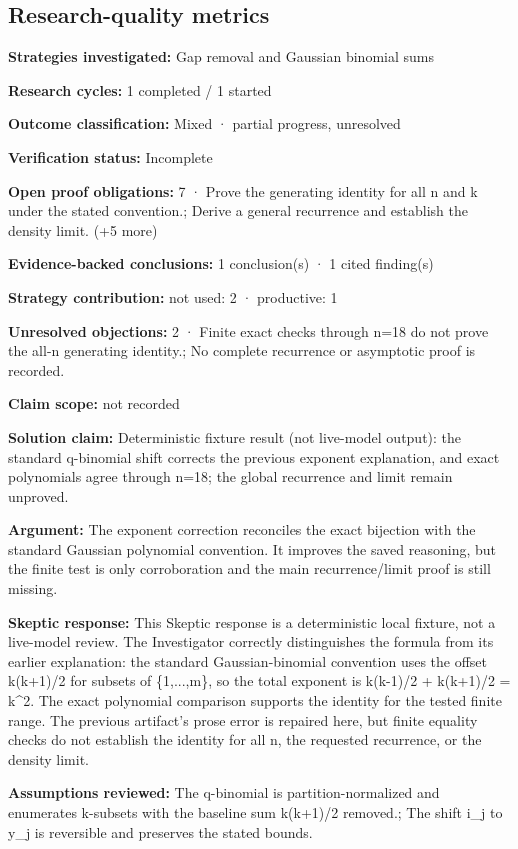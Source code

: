 \documentclass[11pt]{article}
\begin{document}
\subsection{Research-quality metrics}
\textbf{Strategies investigated:} Gap removal and Gaussian binomial sums\par
\textbf{Research cycles:} 1 completed / 1 started\par
\textbf{Outcome classification:} Mixed · partial progress, unresolved\par
\textbf{Verification status:} Incomplete\par
\textbf{Open proof obligations:} 7 · Prove the generating identity for all n and k under the stated convention.; Derive a general recurrence and establish the density limit. (+5 more)\par
\textbf{Evidence-backed conclusions:} 1 conclusion(s) · 1 cited finding(s)\par
\textbf{Strategy contribution:} not used: 2 · productive: 1\par
\textbf{Unresolved objections:} 2 · Finite exact checks through n=18 do not prove the all-n generating identity.; No complete recurrence or asymptotic proof is recorded.\par
\textbf{Claim scope:} not recorded\par
\textbf{Solution claim:} Deterministic fixture result (not live-model output): the standard q-binomial shift corrects the previous exponent explanation, and exact polynomials agree through n=18; the global recurrence and limit remain unproved.\par
\textbf{Argument:} The exponent correction reconciles the exact bijection with the standard Gaussian polynomial convention. It improves the saved reasoning, but the finite test is only corroboration and the main recurrence/limit proof is still missing.\par
\textbf{Skeptic response:} This Skeptic response is a deterministic local fixture, not a live-model review. The Investigator correctly distinguishes the formula from its earlier explanation: the standard Gaussian-binomial convention uses the offset k(k+1)/2 for subsets of \{1,...,m\}, so the total exponent is k(k-1)/2 + k(k+1)/2 = k\textasciicircum{}2. The exact polynomial comparison supports the identity for the tested finite range. The previous artifact's prose error is repaired here, but finite equality checks do not establish the identity for all n, the requested recurrence, or the density limit.\par
\textbf{Assumptions reviewed:} The q-binomial is partition-normalized and enumerates k-subsets with the baseline sum k(k+1)/2 removed.; The shift i\_j to y\_j is reversible and preserves the stated bounds.\par
\end{document}
